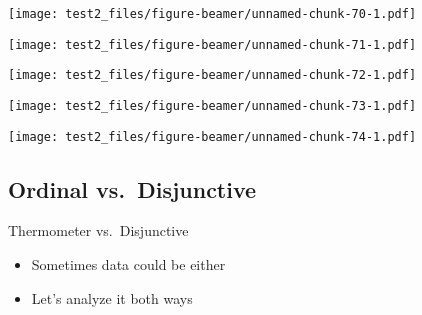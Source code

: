 \documentclass[
  ignorenonframetext,
]{beamer}
\providecommand{\tightlist}{%
  \setlength{\itemsep}{0pt}\setlength{\parskip}{0pt}}
\begin{document}
\begin{frame}

\texttt{[image: test2\_files/figure-beamer/unnamed-chunk-70-1.pdf]}

\end{frame}

\begin{frame}

\texttt{[image: test2\_files/figure-beamer/unnamed-chunk-71-1.pdf]}

\end{frame}

\begin{frame}

\texttt{[image: test2\_files/figure-beamer/unnamed-chunk-72-1.pdf]}

\end{frame}

\begin{frame}

\texttt{[image: test2\_files/figure-beamer/unnamed-chunk-73-1.pdf]}

\end{frame}

\begin{frame}

\texttt{[image: test2\_files/figure-beamer/unnamed-chunk-74-1.pdf]}

\end{frame}

\hypertarget{ordinal-vs.-disjunctive}{%
\subsection{Ordinal vs.~Disjunctive}\label{ordinal-vs.-disjunctive}}

\begin{frame}{Thermometer vs.~Disjunctive}
\protect\hypertarget{thermometer-vs.-disjunctive}{}

\begin{itemize}[<+->]
\tightlist
\item
  Sometimes data could be either
\item
  Let's analyze it both ways
\end{itemize}

\end{frame}
\end{document}
